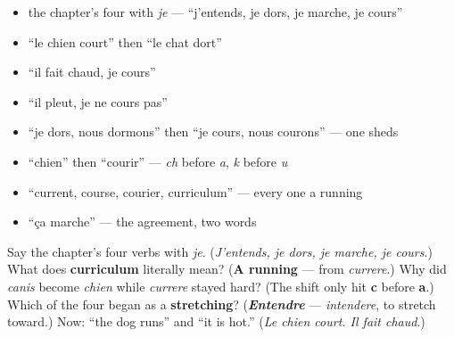 \begin{itemize}
\raggedright
  \item the chapter's four with \emph{je} — \textquotedblleft{}j'entends, je dors, je marche, je cours\textquotedblright{}
  \item \textquotedblleft{}le chien court\textquotedblright{} then \textquotedblleft{}le chat dort\textquotedblright{}
  \item \textquotedblleft{}il fait chaud, je cours\textquotedblright{}
  \item \textquotedblleft{}il pleut, je ne cours pas\textquotedblright{}
  \item \textquotedblleft{}je dors, nous dormons\textquotedblright{} then \textquotedblleft{}je cours, nous courons\textquotedblright{} — one sheds
  \item \textquotedblleft{}chien\textquotedblright{} then \textquotedblleft{}courir\textquotedblright{} — \emph{ch} before \emph{a}, \emph{k} before \emph{u}
  \item \textquotedblleft{}current, course, courier, curriculum\textquotedblright{} — every one a running
  \item \textquotedblleft{}ça marche\textquotedblright{} — the agreement, two words
\end{itemize}

\begin{tcolorbox}[breakable,colback=teal!4,colframe=teal!35!black,title={Before you move on}]
Say the chapter's four verbs with \emph{je}. (\emph{J'entends, je dors, je marche, je cours}.) What does \textbf{curriculum} literally mean? (\textbf{A running} — from \emph{currere}.) Why did \emph{canis} become \emph{chien} while \emph{currere} stayed hard? (The shift only hit \textbf{c} before \textbf{a}.) Which of the four began as a \textbf{stretching}? (\emph{\textbf{Entendre}} — \emph{intendere}, to stretch toward.) Now: \textquotedblleft{}the dog runs\textquotedblright{} and \textquotedblleft{}it is hot.\textquotedblright{} (\emph{Le chien court. Il fait chaud}.)
\end{tcolorbox}
